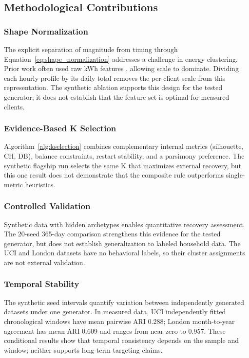 \documentclass[11pt,a4paper]{article}
\begin{document}
\subsection{Methodological Contributions}

\subsubsection{Shape Normalization}

The explicit separation of magnitude from timing through Equation~\ref{eq:shape_normalization} addresses a challenge in energy clustering. Prior work often used raw kWh features \cite{kwac2014household,rhodes2014clustering}, allowing scale to dominate. Dividing each hourly profile by its daily total removes the per-client scale from this representation. The synthetic ablation supports this design for the tested generator; it does not establish that the feature set is optimal for measured clients.

\subsubsection{Evidence-Based K Selection}

Algorithm~\ref{alg:kselection} combines complementary internal metrics (silhouette, CH, DB), balance constraints, restart stability, and a parsimony preference. The synthetic flagship run selects the same K that maximizes external recovery, but this one result does not demonstrate that the composite rule outperforms single-metric heuristics.

\subsubsection{Controlled Validation}

Synthetic data with hidden archetypes enables quantitative recovery assessment. The 20-seed 365-day comparison strengthens this evidence for the tested generator, but does not establish generalization to labeled household data. The UCI and London datasets have no behavioral labels, so their cluster assignments are not external validation.

\subsubsection{Temporal Stability}

The synthetic seed intervals quantify variation between independently generated datasets under one generator. In measured data, UCI independently fitted chronological windows have mean pairwise ARI 0.288; London month-to-year agreement has mean ARI 0.609 and ranges from near zero to 0.957. These conditional results show that temporal consistency depends on the sample and window; neither supports long-term targeting claims.
\end{document}
